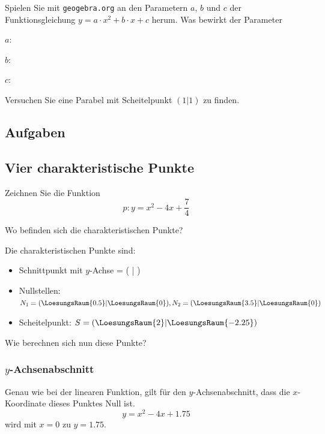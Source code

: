 Spielen Sie mit  \texttt{geogebra.org} an den Parametern $a$, $b$ und $c$ der Funktionsgleichung $y = a\cdot{}x^2 + b\cdot{} x + c$ herum. Was bewirkt der Parameter

$a$: 

$b$: 

$c$: 

Versuchen Sie eine Parabel mit Scheitelpunkt $(1|1)$ zu finden.

\subsection*{Aufgaben}

\newpage

\subsection{Vier charakteristische Punkte}
Zeichnen Sie die Funktion
$$p: y = x^2 - 4x + \frac{7}{4}$$


Wo befinden sich die charakteristischen Punkte?



Die charakteristischen Punkte sind:
\begin{itemize}
\item Schnittpunkt mit $y$-Achse = ( | )
\item Nullstellen: $N_1=(\LoesungsRaum{0.5}| \LoesungsRaum{0}), N_2=( \LoesungsRaum{3.5}|\LoesungsRaum{0})$
\item Scheitelpunkt: $S=(\LoesungsRaum{2}|\LoesungsRaum{-2.25})$
\end{itemize}
 
Wie berechnen sich nun diese Punkte?
\newpage


\subsubsection{$y$-Achsenabschnitt}
Genau wie bei der linearen Funktion, gilt für den $y$-Achsenabschnitt,
dass die $x$-Koordinate dieses Punktes Null ist.
$$y = x^2 -4x + 1.75$$
wird mit $x=0$ zu
$y = 1.75$.

